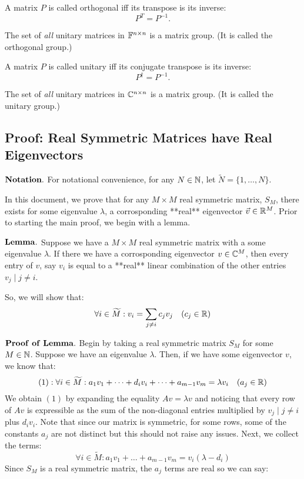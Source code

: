 \begin{definition}
A matrix $P$ is called orthogonal iff its transpose is its inverse:
$$ P^{T}=P^{-1}. $$
\end{definition}

\begin{theorem}
The set of {\em all} unitary matrices in $\mathbb{F}^{n\times n}$ is a matrix group. (It is called the {orthogonal group}.)
\end{theorem}

\begin{definition}
A matrix $P$ is called unitary iff its conjugate transpose is its inverse:
$$ P^{\dagger}=P^{-1}. $$
\end{definition}

\begin{theorem}
The set of {\em all} unitary matrices in $\mathbb{C}^{n\times n}$ is a matrix group. (It is called the {unitary group}.)
\end{theorem}


\newpage

\subsection{Proof: Real Symmetric Matrices have Real Eigenvectors}

$\bf Notation.$ For notational convenience, for any $N \in \mathbb{N}$, let $\widetilde{N} = \{1,\dots,N\}$.

In this document, we prove that for any $M \times M$ real symmetric matrix, $S_M$, there exists for some eigenvalue $\lambda$, a corrosponding **real** eigenvector $\vec{v} \in \mathbb{R}^M$. Prior to starting the main proof, we begin with a lemma.

$\bf Lemma.$ Suppose we have a $M \times M$ real symmetric matrix with a some eigenvalue $\lambda$. If there we have a corrosponding eigenvector $v \in \mathbb{C}^M$, then every entry of $v$, say $v_i$ is equal to a **real** linear combination of the other entries $v_j \mid j \neq i$. 

So, we will show that:
$$\forall i \in \widetilde{M}: v_i =  {\sum_{j \neq i} c_j v_j} \quad (c_j \in \mathbb{R})$$

$\bf Proof \,\,of\,\, Lemma.$ Begin by taking a real symmetric matrix $S_M$ for some $M \in \mathbb{N}$. Suppose we have an eigenvalue $\lambda$. Then, if we have some eigenvector $v$, we know that:
$$(1): \forall i \in \widetilde{M} : a_1v_1 + \dots + d_iv_i + \dots + a_{m-1}v_m = \lambda v_i \quad ( a_j \in \mathbb{R})$$
We obtain $(1)$ by expanding the equality $Av = \lambda v$ and noticing that every row of $Av$ is expressible as the sum of the non-diagonal entries multiplied by $v_j \mid j \neq i$ plus $d_i v_i$. Note that since our matrix is symmetric, for some rows, some of the constants $a_j$ are not distinct but this should not raise any issues. Next, we collect the terms:
$$\forall i \in \widetilde{M} : a_1v_1 + \dots + a_{m-1}v_m =  v_i(\lambda - d_i)$$
Since $S_M$ is a real symmetric matrix, the $a_j$ terms are real so we can say:

